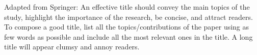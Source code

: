 Adapted from Springer: An effective title should convey the main topics of the study, highlight the importance of the research, be concise, and attract readers.
To compose a good title, list all the topics/contributions of the paper using as few words as possible and include all the most relevant ones in the title.
A long title will appear clumsy and annoy readers.